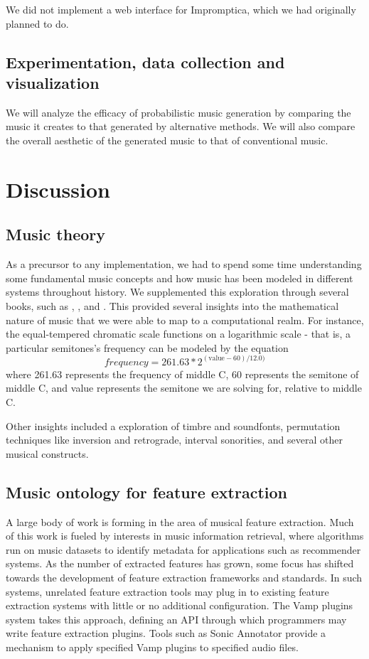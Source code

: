 \documentclass[11pt,conference,letterpaper]{IEEEtran}
\begin{document}
We did not implement a web interface for Impromptica, which we had originally planned to do.

\subsection{Experimentation, data collection and visualization}

We will analyze the efficacy of probabilistic music generation by comparing the music it creates to that generated by alternative methods.  We will also compare the overall aesthetic of the generated music to that of conventional music.

\section{Discussion}

\subsection{Music theory}

As a precursor to any implementation, we had to spend some time understanding some fundamental music concepts and how music has been modeled in different systems throughout history. We supplemented this exploration through several books, such as \cite{temperly2007mprob}, \cite{krogerGeeksNerds}, and \cite{loy2006musimathics}. This provided several insights into the mathematical nature of music that we were able to map to a computational realm. For instance, the equal-tempered chromatic scale functions on a logarithmic scale - that is, a particular semitones's frequency can be modeled by the equation
{\small
	\[frequency = 261.63 * 2^{(\text{value} - 60) / 12.0)}\]
}
where 261.63 represents the frequency of middle C, 60 represents the semitone of middle C, and value represents the semitone we are solving for, relative to middle C.

Other insights included a exploration of timbre and soundfonts, permutation techniques like inversion and retrograde, interval sonorities, and several other musical constructs.

\subsection{Music ontology for feature extraction}

A large body of work is forming in the area of musical feature extraction. Much of this work is fueled by interests in music information retrieval, where algorithms run on music datasets to identify metadata for applications such as recommender systems. As the number of extracted features has grown, some focus has shifted towards the development of feature extraction frameworks and standards. In such systems, unrelated feature extraction tools may plug in to existing feature extraction systems with little or no additional configuration. The Vamp plugins system takes this approach, defining an API through which programmers may write feature extraction plugins. Tools such as Sonic Annotator provide a mechanism to apply specified Vamp plugins to specified audio files.
\end{document}
